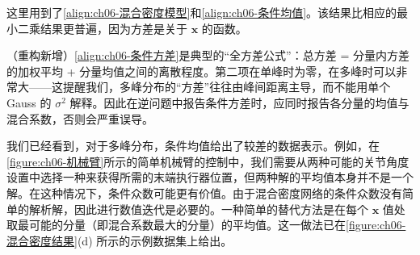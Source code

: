 \documentclass[../../main.tex]{subfiles}
\begin{document}
这里用到了\eqref{align:ch06-混合密度模型}和\eqref{align:ch06-条件均值}。该结果比相应的最小二乘结果更普遍，因为方差是关于 $\boldsymbol{x}$ 的函数。

\begin{remark}（重构新增）\eqref{align:ch06-条件方差}是典型的“全方差公式”：总方差 = 分量内方差的加权平均 + 分量均值之间的离散程度。第二项在单峰时为零，在多峰时可以非常大——这提醒我们，多峰分布的“方差”往往由峰间距离主导，而不能用单个 Gauss 的 $\sigma^{2}$ 解释。因此在逆问题中报告条件方差时，应同时报告各分量的均值与混合系数，否则会严重误导。
\end{remark}

我们已经看到，对于多峰分布，条件均值给出了较差的数据表示。例如，在\cref{figure:ch06-机械臂}所示的简单机械臂的控制中，我们需要从两种可能的关节角度设置中选择一种来获得所需的末端执行器位置，但两种解的平均值本身并不是一个解。在这种情况下，条件众数可能更有价值。由于混合密度网络的条件众数没有简单的解析解，因此进行数值迭代是必要的。一种简单的替代方法是在每个 $\boldsymbol{x}$ 值处取最可能的分量（即混合系数最大的分量）的平均值。这一做法已在\cref{figure:ch06-混合密度结果}(d) 所示的示例数据集上给出。
\end{document}
